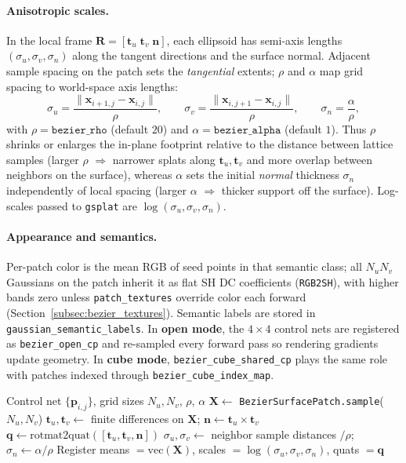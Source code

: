 \documentclass{report}
\newcommand{\code}[1]{\nolinkurl{#1}}
\begin{document}
\paragraph{Anisotropic scales.}
In the local frame $\mathbf{R}=[\mathbf{t}_u\;\mathbf{t}_v\;\mathbf{n}]$, each ellipsoid has semi-axis lengths $(\sigma_u,\sigma_v,\sigma_n)$ along the tangent directions and the surface normal. Adjacent sample spacing on the patch sets the \emph{tangential} extents; $\rho$ and $\alpha$ map grid spacing to world-space axis lengths:
\[
\sigma_u = \frac{\|\mathbf{x}_{i+1,j}-\mathbf{x}_{i,j}\|}{\rho},\qquad
\sigma_v = \frac{\|\mathbf{x}_{i,j+1}-\mathbf{x}_{i,j}\|}{\rho},
\qquad
\sigma_n = \frac{\alpha}{\rho},
\]
with $\rho=\texttt{bezier\_rho}$ (default $20$) and $\alpha=\texttt{bezier\_alpha}$ (default $1$). Thus $\rho$ shrinks or enlarges the in-plane footprint relative to the distance between lattice samples (larger $\rho$ $\Rightarrow$ narrower splats along $\mathbf{t}_u,\mathbf{t}_v$ and more overlap between neighbors on the surface), whereas $\alpha$ sets the initial \emph{normal} thickness $\sigma_n$ independently of local spacing (larger $\alpha$ $\Rightarrow$ thicker support off the surface). Log-scales passed to \texttt{gsplat} are $\log(\sigma_u,\sigma_v,\sigma_n)$.

\paragraph{Appearance and semantics.}
Per-patch color is the mean RGB of seed points in that semantic class; all $N_u N_v$ Gaussians on the patch inherit it as flat SH DC coefficients (\texttt{RGB2SH}), with higher bands zero unless \texttt{patch\_textures} override color each forward (Section~\ref{subsec:bezier_textures}). Semantic labels are stored in \code{gaussian\_semantic\_labels}. In \textbf{open mode}, the $4\times 4$ control nets are registered as \code{bezier\_open\_cp} and re-sampled every forward pass so rendering gradients update geometry. In \textbf{cube mode}, \code{bezier\_cube\_shared\_cp} plays the same role with patches indexed through \code{bezier\_cube\_index\_map}.

\begin{algorithm}[htbp]
\caption{From B\'ezier patch samples to initial Gaussian parameters (open mode)}
\label{alg:bezier_gaussian_seed}
\begin{algorithmic}[1]
\Require Control net $\{\mathbf{p}_{i,j}\}$, grid sizes $N_u,N_v$, $\rho$, $\alpha$
\State $\mathbf{X} \gets$ \texttt{BezierSurfacePatch.sample}($N_u,N_v$) 
\State $\mathbf{t}_u,\mathbf{t}_v \gets$ finite differences on $\mathbf{X}$; $\mathbf{n} \gets \mathbf{t}_u \times \mathbf{t}_v$
\State $\mathbf{q} \gets \mathrm{rotmat2quat}([\mathbf{t}_u,\mathbf{t}_v,\mathbf{n}])$
\State $\sigma_u,\sigma_v \gets$ neighbor sample distances $/\rho$; $\sigma_n \gets \alpha/\rho$
\State Register means $=\mathrm{vec}(\mathbf{X})$, scales $=\log(\sigma_u,\sigma_v,\sigma_n)$, quats $=\mathbf{q}$
\end{algorithmic}
\end{algorithm}
\end{document}
